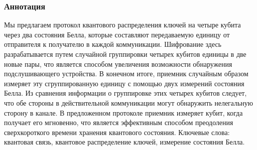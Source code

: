 \subsubsection*{Аннотация}

Мы предлагаем протокол квантового распределения ключей на четыре кубита через два состояния Белла, которые составляют передаваемую единицу от отправителя к получателю в каждой коммуникации.
Шифрование здесь разрабатывается путем случайной группировки четырех кубитов единицы в две новые пары, что является способом увеличения возможности обнаружения подслушивающего устройства. В конечном итоге, приемник случайным образом измеряет эту сгруппированную единицу с помощью двух измерений состояния Белла. Из сравнения информации о группировке этих четырех кубитов следует, что обе стороны в действительной коммуникации могут обнаружить нелегальную сторону в канале. В предложенном протоколе приемник измеряет кубит, когда получает его мгновенно, что является эффективным способом преодоления сверхкороткого времени хранения квантового состояния.
Ключевые слова: квантовая связь, квантовое распределение ключей, измерение состояния Белла.

